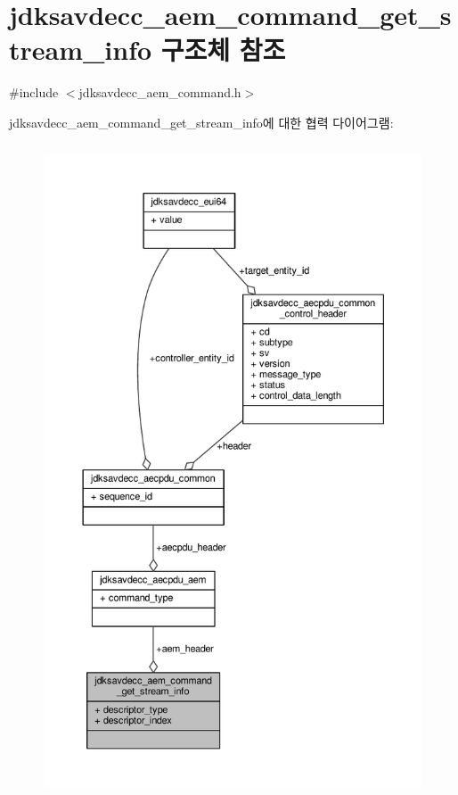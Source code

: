 \hypertarget{structjdksavdecc__aem__command__get__stream__info}{}\section{jdksavdecc\+\_\+aem\+\_\+command\+\_\+get\+\_\+stream\+\_\+info 구조체 참조}
\label{structjdksavdecc__aem__command__get__stream__info}


{\ttfamily \#include $<$jdksavdecc\+\_\+aem\+\_\+command.\+h$>$}



jdksavdecc\+\_\+aem\+\_\+command\+\_\+get\+\_\+stream\+\_\+info에 대한 협력 다이어그램\+:
\nopagebreak
\begin{figure}[H]
\begin{center}
\leavevmode
\includegraphics[height=550pt]{structjdksavdecc__aem__command__get__stream__info__coll__graph}
\end{center}
\end{figure}
